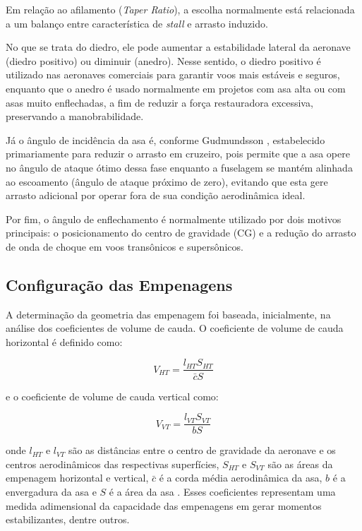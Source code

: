 Em relação ao afilamento (\textit{Taper Ratio}), a escolha normalmente está relacionada a um balanço entre característica de \textit{stall} e arrasto induzido. \cite{gudmundsson2021}

No que se trata do diedro, ele pode aumentar a estabilidade lateral da aeronave (diedro positivo) ou diminuir (anedro). Nesse sentido, o diedro positivo é  utilizado nas aeronaves comerciais para garantir voos mais estáveis e seguros, enquanto que o anedro é usado normalmente em projetos com asa alta ou com asas muito enflechadas, a fim de reduzir a força restauradora excessiva, preservando a manobrabilidade.

Já o ângulo de incidência da asa é, conforme Gudmundsson \cite{gudmundsson2021}, estabelecido primariamente para reduzir o arrasto em cruzeiro, pois permite que a asa opere no ângulo de ataque ótimo dessa fase enquanto a fuselagem se mantém alinhada ao escoamento (ângulo de ataque próximo de zero), evitando que esta gere arrasto adicional por operar fora de sua condição aerodinâmica ideal.

Por fim, o ângulo de enflechamento é normalmente utilizado por dois motivos principais: o posicionamento do centro de gravidade (CG) e a redução do arrasto de onda de choque em voos transônicos e supersônicos.


\subsection{Configuração das Empenagens}

A determinação da geometria das empenagem foi baseada, inicialmente, na análise dos coeficientes de volume de cauda. O coeficiente de volume de cauda horizontal é definido como:

\begin{equation}
V_{HT} = \frac{l_{HT} S_{HT}}{\bar{c} S}
\end{equation}

e o coeficiente de volume de cauda vertical como:

\begin{equation}
V_{VT} = \frac{l_{VT} S_{VT}}{b S}
\end{equation}

onde $l_{HT}$ e $l_{VT}$ são as distâncias entre o centro de gravidade da aeronave e os centros aerodinâmicos das respectivas superfícies, $S_{HT}$ e $S_{VT}$ são as áreas da empenagem horizontal e vertical, $\bar{c}$ é a corda média aerodinâmica da asa, $b$ é a envergadura da asa e $S$ é a área da asa \cite{anderson1999}. Esses coeficientes representam uma medida adimensional da capacidade das empenagens em gerar momentos estabilizantes, dentre outros.

